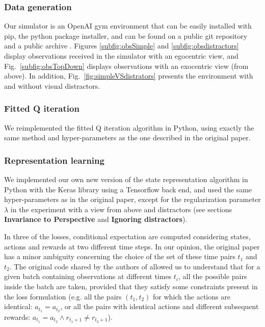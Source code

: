 \documentclass[10pt,a4paper,onecolumn]{article}
\begin{document}
\subsubsection*{Data generation}
\label{sec:DataGeneration}

Our simulator is an OpenAI gym environment \cite{openAIgymref} that can be easily installed with pip, the python package installer, and can be found on a public git repository \cite{RoundBotRepo} and a public archive \cite{RoundBotArchive}. 
Figures \ref{subfig:obsSimple} and \ref{subfig:obsdistractors} display observations received in the simulator with an egocentric view, and Fig.~\ref{subfig:obsTopDown} displays observations with an exocentric view (from above). In addition, Fig.~\ref{fig:simpleVSdistrators} presents the environment with and without visual distractors.


\subsubsection*{Fitted Q iteration}
\label{sec:FittedQIteration}

We reimplemented the fitted Q iteration algorithm in Python, using exactly the same method and hyper-parameters as the one described in the original paper.

\subsubsection*{Representation learning}
\label{sec:RepresentationLearning}

We implemented our own new version of the state representation algorithm in Python with the Keras library using a Tensorflow back end, and used the same hyper-parameters as in the original paper, except for the regularization parameter $\lambda$ in the experiment with a view from above and distractors (see sections \textsf{\textbf{Invariance to Perspective}} and \textsf{\textbf{Ignoring distractors}}).

In three of the losses, conditional expectation are computed considering states, actions and rewards at two different time steps. In our opinion, the original paper has a minor ambiguity concerning the choice of the set of these time pairs $t_1$ and $t_2$. The original code shared by the authors of \cite{jonschkowski2015learning} allowed us to understand that for a given batch containing observations at different times $t_i$, all the possible pairs inside the batch are taken, provided that they satisfy some constraints present in the loss formulation (e.g. all the pairs $(t_1,t_2)$ for which the actions are identical: $a_{t_1}=a_{t_2}$,
or all the pairs with identical actions and different subsequent rewards: $a_{t_1}=a_{t_2} \wedge r_{t_1+1} \neq r_{t_2+1}$).
\end{document}
